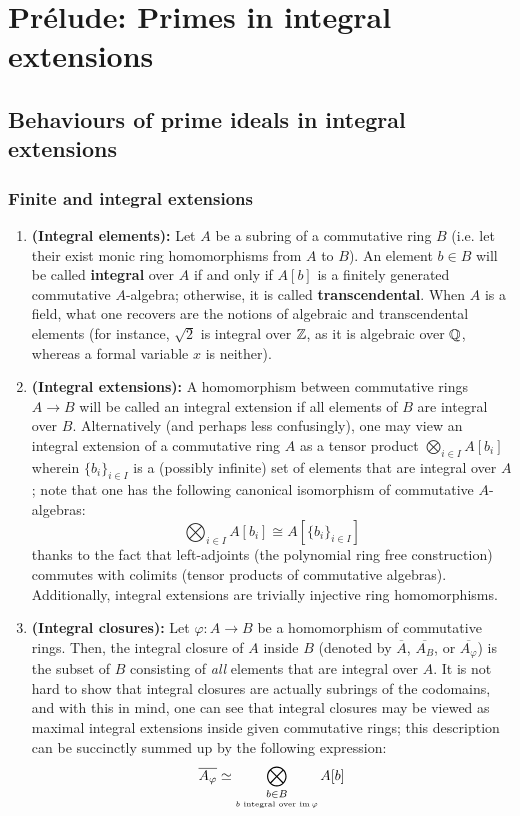 \section{Pr\'elude: Primes in integral extensions}
    \subsection{Behaviours of prime ideals in integral extensions}
        \subsubsection{Finite and integral extensions}
            \begin{definition} \label{def: integral_extensions}  
                \noindent
                \begin{enumerate}
                    \item \textbf{(Integral elements):} Let $A$ be a subring of a commutative ring $B$ (i.e. let their exist monic ring homomorphisms from $A$ to $B$). An element $b \in B$ will be called \textbf{integral} over $A$ if and only if $A[b]$ is a finitely generated commutative $A$-algebra; otherwise, it is called \textbf{transcendental}. When $A$ is a field, what one recovers are the notions of algebraic and transcendental elements (for instance, $\sqrt{2}$ is integral over $\mathbb{Z}$, as it is algebraic over $\mathbb{Q}$, whereas a formal variable $x$ is neither). 
                    \item \textbf{(Integral extensions):} A homomorphism between commutative rings $A \to B$ will be called an integral extension if all elements of $B$ are integral over $B$. Alternatively (and perhaps less confusingly), one may view an integral extension of a commutative ring $A$ as a tensor product $\bigotimes_{i \in I} A[b_i]$ wherein $\{b_i\}_{i \in I}$ is a (possibly infinite) set of elements that are integral over $A$; note that one has the following canonical isomorphism of commutative $A$-algebras:
                        $$\bigotimes_{i \in I} A[b_i] \cong A\left[\{b_i\}_{i \in I}\right]$$
                    thanks to the fact that left-adjoints (the polynomial ring free construction) commutes with colimits (tensor products of commutative algebras). Additionally, integral extensions are trivially injective ring homomorphisms.
                    \item \textbf{(Integral closures):} Let $\varphi: A \to B$ be a homomorphism of commutative rings. Then, the integral closure of $A$ inside $B$ (denoted by $\overline{A}$, $\overline{A_B}$, or $\overline{A_{\varphi}}$) is the subset of $B$ consisting of \textit{all} elements that are integral over $A$. It is not hard to show that integral closures are actually subrings of the codomains, and with this in mind, one can see that integral closures may be viewed as maximal integral extensions inside given commutative rings; this description can be succinctly summed up by the following expression:
                        $$\overline{A_{\varphi}} \simeq \bigotimes_{\underset{\text{$b$ integral over $\operatorname{im} \varphi$}}{b \in B}} A[b]$$
                \end{enumerate}
            \end{definition}
